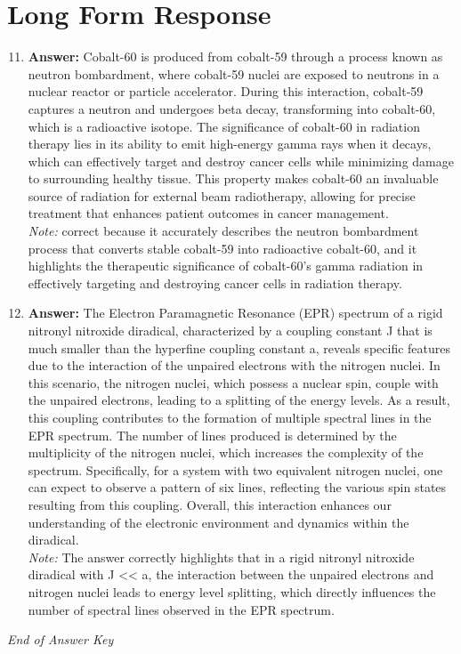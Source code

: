 \documentclass[12pt]{article}
\begin{document}
\section*{Long Form Response}
\begin{enumerate}[label=\arabic*.]
\setcounter{enumi}{10}
\item \textbf{Answer:} Cobalt-60 is produced from cobalt-59 through a process known as neutron bombardment, where cobalt-59 nuclei are exposed to neutrons in a nuclear reactor or particle accelerator. During this interaction, cobalt-59 captures a neutron and undergoes beta decay, transforming into cobalt-60, which is a radioactive isotope. The significance of cobalt-60 in radiation therapy lies in its ability to emit high-energy gamma rays when it decays, which can effectively target and destroy cancer cells while minimizing damage to surrounding healthy tissue. This property makes cobalt-60 an invaluable source of radiation for external beam radiotherapy, allowing for precise treatment that enhances patient outcomes in cancer management.
\\ \textit{Note:} correct because it accurately describes the neutron bombardment process that converts stable cobalt-59 into radioactive cobalt-60, and it highlights the therapeutic significance of cobalt-60's gamma radiation in effectively targeting and destroying cancer cells in radiation therapy.
\item \textbf{Answer:} The Electron Paramagnetic Resonance (EPR) spectrum of a rigid nitronyl nitroxide diradical, characterized by a coupling constant J that is much smaller than the hyperfine coupling constant a, reveals specific features due to the interaction of the unpaired electrons with the nitrogen nuclei. In this scenario, the nitrogen nuclei, which possess a nuclear spin, couple with the unpaired electrons, leading to a splitting of the energy levels. As a result, this coupling contributes to the formation of multiple spectral lines in the EPR spectrum. The number of lines produced is determined by the multiplicity of the nitrogen nuclei, which increases the complexity of the spectrum. Specifically, for a system with two equivalent nitrogen nuclei, one can expect to observe a pattern of six lines, reflecting the various spin states resulting from this coupling. Overall, this interaction enhances our understanding of the electronic environment and dynamics within the diradical.
\\ \textit{Note:} The answer correctly highlights that in a rigid nitronyl nitroxide diradical with J \textless{}\textless{} a, the interaction between the unpaired electrons and nitrogen nuclei leads to energy level splitting, which directly influences the number of spectral lines observed in the EPR spectrum.
\end{enumerate}

\vfill
\noindent\textit{End of Answer Key}
\end{document}
